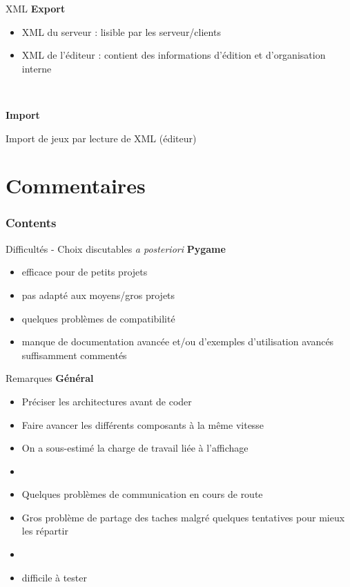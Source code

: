 \documentclass[11pt]{beamer}
\begin{document}
\begin{frame}{XML}
	\textbf{Export}
	\begin{itemize}
		\item XML du serveur : lisible par les serveur/clients
		\item XML de l'éditeur : contient des informations d'édition et d'organisation interne
	\end{itemize}
	
	~
	
	\textbf{Import}
	
	Import de jeux par lecture de XML (éditeur)
\end{frame}


\section{Commentaires}

    \begin{frame}
        \frametitle{Contents}
        \tableofcontents[currentsection]
    \end{frame}
    
\begin{frame}{Difficultés - Choix discutables \textit{a posteriori}}
	\textbf{Pygame}
	\begin{itemize}
		\item efficace pour de petits projets
		\item pas adapté aux moyens/gros projets
		\item quelques problèmes de compatibilité
		\item manque de documentation avancée et/ou d'exemples d'utilisation avancés suffisamment commentés
	\end{itemize}
\end{frame}


\begin{frame}{Remarques}
	\textbf{Général}
	\begin{itemize}
		\item Préciser les architectures avant de coder
		\item Faire avancer les différents composants à la même vitesse
		\item On a sous-estimé la charge de travail liée à l'affichage
		\item[]
		\item Quelques problèmes de communication en cours de route
		\item Gros problème de partage des taches malgré quelques tentatives pour mieux les répartir
		\item[]
		\item difficile à tester
	\end{itemize}
\end{frame}
\end{document}
